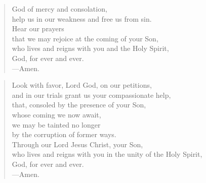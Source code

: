 \prayer

\setlength{\vleftmargin}{\prayerleftmargini}

\begin{verse}
God of mercy and consolation,\\
help us in our weakness and free us from sin.\\
Hear our prayers\\
that we may rejoice at the coming of your Son,\\
who lives and reigns with you and the Holy Spirit,\\
God, for ever and ever.\\
{\color{red}---\thinspace}Amen.
\end{verse}


\begin{verse}
Look with favor, Lord God, on our petitions,\\
and in our trials grant us your compassionate help,\\
that, consoled by the presence of your Son,\\
whose coming we now await,\\
we may be tainted no longer\\
by the corruption of former ways.\\
Through our Lord Jesus Christ, your Son,\\
who lives and reigns with you in the unity of the Holy Spirit,\\
God, for ever and ever.\\
{\color{red}---\thinspace}Amen.
\end{verse}

\setlength{\vleftmargin}{\defleftmargini}
